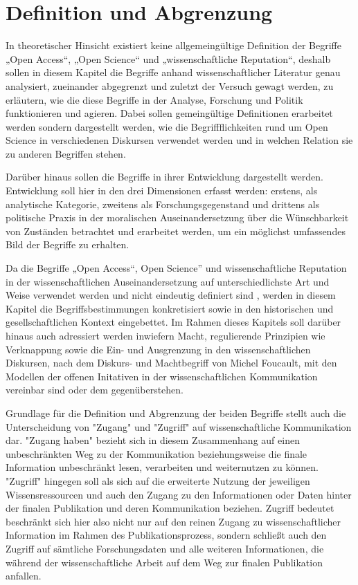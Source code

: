 \chapter{Definition und Abgrenzung} 
In theoretischer Hinsicht existiert keine allgemeingültige Definition der Begriffe „Open Access“, „Open Science“ und „wissenschaftliche Reputation“, deshalb sollen in diesem Kapitel die Begriffe anhand wissenschaftlicher Literatur genau analysiert, zueinander abgegrenzt und zuletzt der Versuch gewagt werden, zu erläutern, wie die diese Begriffe in der Analyse, Forschung und Politik funktionieren und agieren. Dabei sollen gemeingültige Definitionen erarbeitet werden sondern dargestellt werden, wie die Begriffflichkeiten rund um Open Science in verschiedenen Diskursen verwendet werden und in welchen Relation sie zu anderen Begriffen stehen.

Darüber hinaus sollen die Begriffe in ihrer Entwicklung dargestellt werden. Entwicklung soll hier in den drei Dimensionen erfasst werden: erstens, als analytische Kategorie, zweitens als Forschungsgegenstand und drittens als politische Praxis in der moralischen Auseinandersetzung über die Wünschbarkeit von Zuständen betrachtet und erarbeitet werden, um ein möglichst umfassendes Bild der Begriffe zu erhalten. \cite{cite:10}

Da die Begriffe „Open Access“, Open Science” und wissenschaftliche Reputation in der wissenschaftlichen Auseinandersetzung auf unterschiedlichste Art und Weise verwendet werden und nicht eindeutig definiert sind \cite{cite:9}, werden in diesem Kapitel die Begriffsbestimmungen konkretisiert sowie in den historischen und gesellschaftlichen Kontext eingebettet.
Im Rahmen dieses Kapitels soll darüber hinaus auch adressiert werden inwiefern Macht, regulierende Prinzipien wie Verknappung sowie die Ein- und Ausgrenzung in den wissenschaftlichen Diskursen, nach dem Diskurs- und Machtbegriff  von Michel Foucault, mit den Modellen der offenen Initativen in der wissenschaftlichen Kommunikation vereinbar sind oder dem gegenüberstehen.

Grundlage für die Definition und Abgrenzung der beiden Begriffe stellt auch die Unterscheidung von "Zugang" und "Zugriff" auf wissenschaftliche Kommunikation dar. "Zugang haben" bezieht sich in diesem Zusammenhang auf einen unbeschränkten Weg zu der Kommunikation beziehungsweise die finale Information unbeschränkt lesen\cite{cite:9a}, verarbeiten und weiternutzen zu können. "Zugriff" hingegen soll als sich auf die erweiterte Nutzung der jeweiligen Wissensressourcen und auch den Zugang zu den Informationen oder Daten hinter der finalen Publikation und deren Kommunikation beziehen\cite{cite:9b}. Zugriff bedeutet beschränkt sich hier also nicht nur auf den reinen Zugang zu wissenschaftlicher Information im Rahmen des Publikationsprozess, sondern schließt auch den Zugriff auf sämtliche Forschungsdaten und alle weiteren Informationen, die während der wissenschaftliche Arbeit auf dem Weg zur finalen Publikation anfallen\cite{cite:9c}.